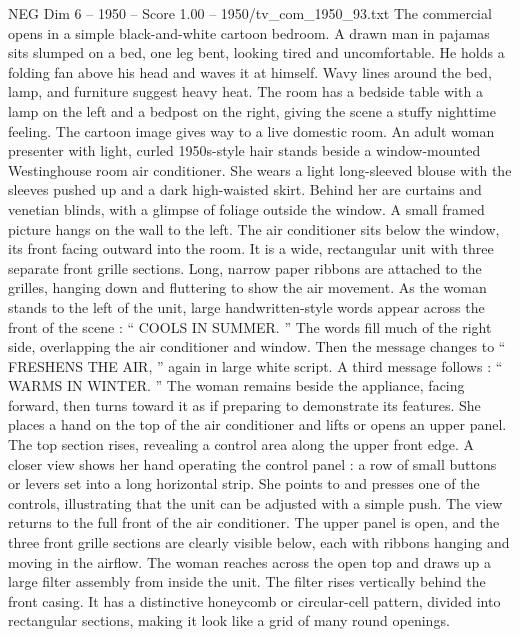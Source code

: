\begin{textsample}{NEG Dim 6 – 1950 – Score 1.00 – 1950/tv\_com\_1950\_93.txt}  \label{ex:f6_neg_085}
The commercial opens in a simple black-and-white cartoon bedroom.
A drawn man in pajamas sits slumped on a bed, one leg bent, looking tired and uncomfortable.
He holds a folding fan above his head and waves it at himself.
Wavy lines around the bed, lamp, and furniture suggest heavy heat.
The room has a bedside table with a lamp on the left and a bedpost on the right, giving the scene a stuffy nighttime feeling.
The cartoon image gives way to a live domestic room.
An adult woman presenter with light, curled 1950s-style hair stands beside a window-mounted Westinghouse room air conditioner.
She wears a light long-sleeved blouse with the sleeves pushed up and a dark high-waisted skirt.
Behind her are curtains and venetian blinds, with a glimpse of foliage outside the window.
A small framed picture hangs on the wall to the left.
The air conditioner sits below the window, its front facing outward into the room.
It is a wide, rectangular unit with three separate front grille sections.
Long, narrow paper ribbons are attached to the grilles, hanging down and fluttering to show the air movement.
As the woman stands to the left of the unit, large handwritten-style words appear across the front of the scene : “ COOLS IN SUMMER. ” The words fill much of the right side, overlapping the air conditioner and window.
Then the message changes to “ FRESHENS THE AIR, ” again in large white script.
A third message follows : “ WARMS IN WINTER. ” The woman remains beside the appliance, facing forward, then turns toward it as if preparing to demonstrate its features.
She places a hand on the top of the air conditioner and lifts or opens an upper panel.
The top section rises, revealing a control area along the upper front edge.
A closer view shows her hand operating the control panel : a row of small buttons or levers set into a long horizontal strip.
She points to and presses one of the controls, illustrating that the unit can be adjusted with a simple push.
The view returns to the full front of the air conditioner.
The upper panel is open, and the three front grille sections are clearly visible below, each with ribbons hanging and moving in the airflow.
The woman reaches across the open top and draws up a large filter assembly from inside the unit.
The filter rises vertically behind the front casing.
It has a distinctive honeycomb or circular-cell pattern, divided into rectangular sections, making it look like a grid of many round openings.

\end{textsample}
